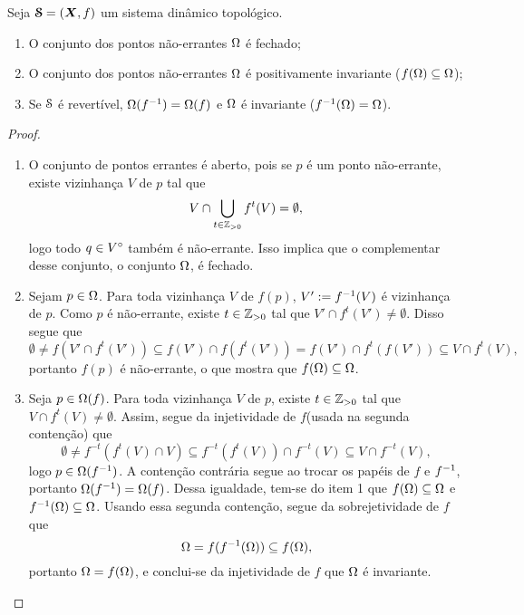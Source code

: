 \begin{proposition}
Seja $\bm{\mathcal{S}}=(\bm X,f)$ um sistema dinâmico topológico.
	\begin{enumerate}
	\item O conjunto dos pontos não-errantes $\Omega$ é fechado;
	\item O conjunto dos pontos não-errantes $\Omega$ é positivamente invariante ($f(\Omega) \subseteq \Omega$);
	\item Se $\mathcal{S}$ é revertível, $\Omega(f^{-1}) = \Omega(f)$ e $\Omega$ é invariante ($f^{-1}(\Omega) = \Omega$).
	\end{enumerate}
\end{proposition}
\begin{proof}
	\begin{enumerate}
	\item O conjunto de pontos errantes é aberto, pois se $p$ é um ponto não-errante, existe vizinhança $V$ de $p$ tal que
	\begin{equation*}
	V \cap \bigcup_{t \in \mathbb{Z}_{>0}}f^t(V) = \emptyset,
	\end{equation*}
logo todo $q \in {V}^\circ$ também é não-errante. Isso implica que o complementar desse conjunto, o conjunto $\Omega$, é fechado.

	\item Sejam $p \in \Omega$. Para toda vizinhança $V$ de $f(p)$, $V' := f^{-1}(V)$ é vizinhança de $p$. Como $p$ é não-errante, existe $t \in \mathbb{Z}_{>0}$ tal que $V' \cap f^t(V') \neq \emptyset$. Disso segue que
	\begin{equation*}
	\emptyset \neq f(V' \cap f^t(V')) \subseteq f(V') \cap f(f^t(V')) = f(V') \cap f^t(f(V')) \subseteq V \cap f^t(V),
	\end{equation*}
portanto $f(p)$ é não-errante, o que mostra que $f(\Omega) \subseteq \Omega$.

	\item Seja $p \in \Omega(f)$. Para toda vizinhança $V$ de $p$, existe $t \in \mathbb{Z}_{>0}$ tal que $ V \cap f^t(V) \neq \emptyset$. Assim, segue da injetividade de $f$(usada na segunda contenção) que
	\begin{equation*}
	\emptyset \neq f^{-t}(f^t(V) \cap V) \subseteq f^{-t}(f^t(V)) \cap f^{-t}(V) \subseteq V \cap f^{-t}(V),
	\end{equation*}
logo $p \in \Omega(f^{-1})$. A contenção contrária segue ao trocar os papéis de $f$ e $f^{-1}$, portanto $\Omega(f^{-1}) = \Omega(f)$. Dessa igualdade, tem-se do item 1 que $f(\Omega) \subseteq \Omega$ e $f^{-1}(\Omega) \subseteq \Omega$. Usando essa segunda contenção, segue da sobrejetividade de $f$ que
	\begin{equation*}
	\Omega = f(f^{-1}(\Omega)) \subseteq f(\Omega),
	\end{equation*}
portanto $\Omega = f(\Omega)$, e conclui-se da injetividade de $f$ que $\Omega$ é invariante.
\qedhere
	\end{enumerate}
\end{proof}


